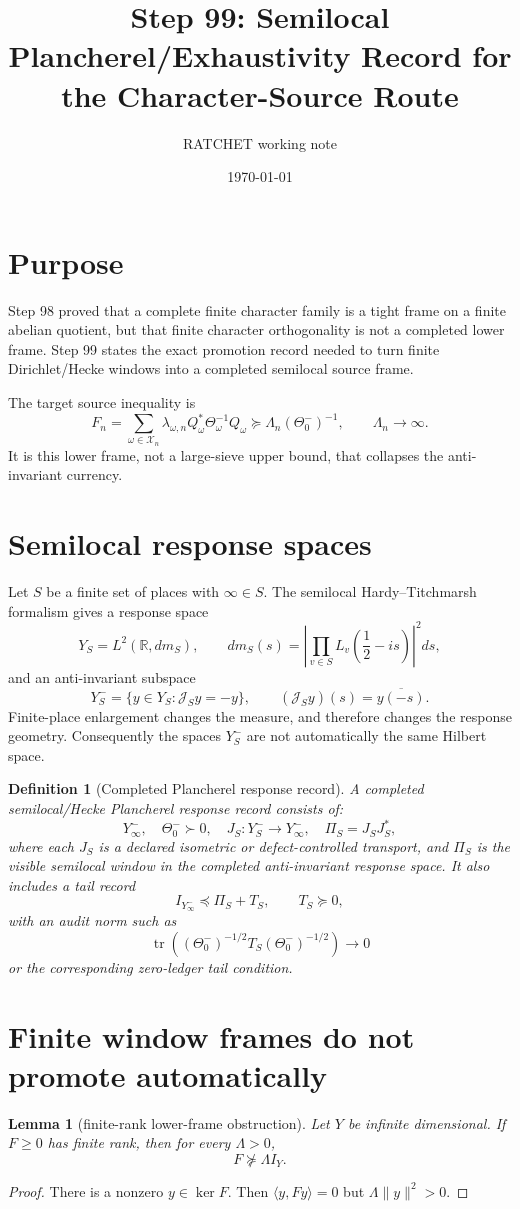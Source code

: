 \documentclass[11pt]{article}
\title{Step 99: Semilocal Plancherel/Exhaustivity Record for the Character-Source Route}
\author{RATCHET working note}
\date{\today}
\newtheorem{lemma}{Lemma}
\newtheorem{definition}{Definition}
\newcommand{\tr}{\operatorname{tr}}
\begin{document}
\maketitle

\section{Purpose}
Step 98 proved that a complete finite character family is a tight frame on a finite abelian quotient, but that finite character orthogonality is not a completed lower frame.  Step 99 states the exact promotion record needed to turn finite Dirichlet/Hecke windows into a completed semilocal source frame.

The target source inequality is
\[
F_n
=
\sum_{\omega\in\mathcal X_n}
\lambda_{\omega,n} Q_\omega^*\Theta_\omega^{-1}Q_\omega
\succeq
\Lambda_n(\Theta_0^-)^{-1},
\qquad
\Lambda_n\to\infty.
\]
It is this lower frame, not a large-sieve upper bound, that collapses the anti-invariant currency.

\section{Semilocal response spaces}
Let \(S\) be a finite set of places with \(\infty\in S\).  The semilocal Hardy--Titchmarsh formalism gives a response space
\[
Y_S=L^2(\mathbb R,dm_S),
\qquad
 dm_S(s)=\left|\prod_{v\in S}L_v\left(\frac12-is\right)\right|^2ds,
\]
and an anti-invariant subspace
\[
Y_S^-=
\{y\in Y_S:\mathcal J_Sy=-y\},
\qquad
(\mathcal J_Sy)(s)=\overline{y(-s)}.
\]
Finite-place enlargement changes the measure, and therefore changes the response geometry.  Consequently the spaces \(Y_S^-\) are not automatically the same Hilbert space.

\begin{definition}[Completed Plancherel response record]
A completed semilocal/Hecke Plancherel response record consists of:
\[
Y_\infty^-,\quad \Theta_0^-\succ0,\quad
J_S:Y_S^-\to Y_\infty^-,\quad
\Pi_S=J_SJ_S^*,
\]
where each \(J_S\) is a declared isometric or defect-controlled transport, and \(\Pi_S\) is the visible semilocal window in the completed anti-invariant response space.
It also includes a tail record
\[
I_{Y_\infty^-}
\preceq
\Pi_S+T_S,
\qquad
T_S\succeq0,
\]
with an audit norm such as
\[
\tr\left((\Theta_0^-)^{-1/2}T_S(\Theta_0^-)^{-1/2}\right)\to0
\]
or the corresponding zero-ledger tail condition.
\end{definition}

\section{Finite window frames do not promote automatically}
\begin{lemma}[finite-rank lower-frame obstruction]
Let \(Y\) be infinite dimensional.  If \(F\ge0\) has finite rank, then for every \(\Lambda>0\),
\[
F\nsucceq \Lambda I_Y.
\]
\end{lemma}
\begin{proof}
There is a nonzero \(y\in\ker F\).  Then \(\langle y,Fy\rangle=0\) but \(\Lambda\|y\|^2>0\).
\end{proof}
\end{document}
